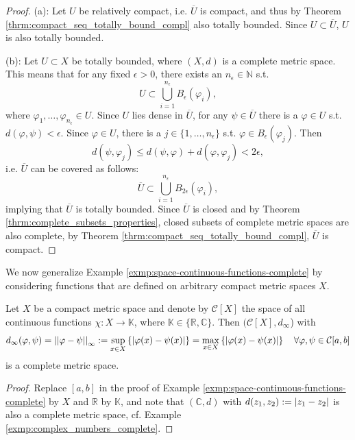 \begin{proof}
	(a): Let $U$ be relatively compact, i.e. $\overline{U}$ is compact, and thus by Theorem \ref{thrm:compact_seq_totally_bound_compl} also totally bounded. Since $U\subset \overline{U}$, $U$ is also totally bounded.
	
	(b): Let $U\subset X$ be totally bounded, where $(X, d)$ is a complete metric space. This means that for any fixed $\epsilon > 0$, there exists an $n_{\epsilon}\in\mathbb N$ s.t.
	$$U\subset \bigcup_{i=1}^{n_{\epsilon}}B_{\epsilon}(\varphi_i),$$
	where $\varphi_1, \dots, \varphi_{n_{\epsilon}}\in U$. Since $U$ lies dense in $\overline{U}$, for any $\psi\in\overline{U}$ there is a $\varphi\in U$ s.t. $d(\varphi, \psi) < \epsilon$. Since $\varphi\in U$, there is a $j\in\{1, \dots, n_{\epsilon}\}$ s.t. $\varphi\in B_{\epsilon}(\varphi_j)$. Then
	$$d(\psi, \varphi_j) \leq d(\psi, \varphi) + d(\varphi, \varphi_j) < 2\epsilon,$$
	i.e. $\overline{U}$ can be covered as follows:
	$$\overline{U}\subset \bigcup_{i=1}^{n_{\epsilon}}B_{2\epsilon}(\varphi_i),$$ implying that $\overline{U}$ is totally bounded. Since $\overline{U}$ is closed and by Theorem \ref{thrm:complete_subsets_properties}, closed subsets of complete metric spaces are also complete, by Theorem \ref{thrm:compact_seq_totally_bound_compl}, $\overline{U}$ is compact.
\end{proof}

We now generalize Example \ref{exmp:space-continuous-functions-complete} by considering functions that are defined on arbitrary compact metric spaces $X$.

\begin{theorem}
	Let $X$ be a compact metric space and denote by $\mathcal C[X]$ the space of all continuous functions $\chi: X\to\mathbb K$, where $\mathbb K \in \{\mathbb R, \mathbb C\}$. Then $(\mathcal C[X], d_{\infty}$) with $$d_{\infty}(\varphi, \psi) = \left\vert\left\vert \varphi - \psi \right\vert\right\vert_{\infty} := \sup_{x\in X}\left\{ \left\vert \varphi(x) - \psi(x) \right\vert \right\} = \max_{x\in X}\left\{\left\vert \varphi(x) - \psi(x) \right\vert\right\}\quad \forall \varphi, \psi\in\mathcal C[a, b]$$
	is a complete metric space.
\end{theorem}

\begin{proof}
	Replace $[a, b]$ in the proof of Example \ref{exmp:space-continuous-functions-complete} by $X$ and $\mathbb R$ by $\mathbb K$, and note that $(\mathbb C, d)$ with $d(z_1, z_2) := \left\vert z_1 - z_2 \right\vert$ is also a complete metric space, cf. Example \ref{exmp:complex_numbers_complete}.
\end{proof}

